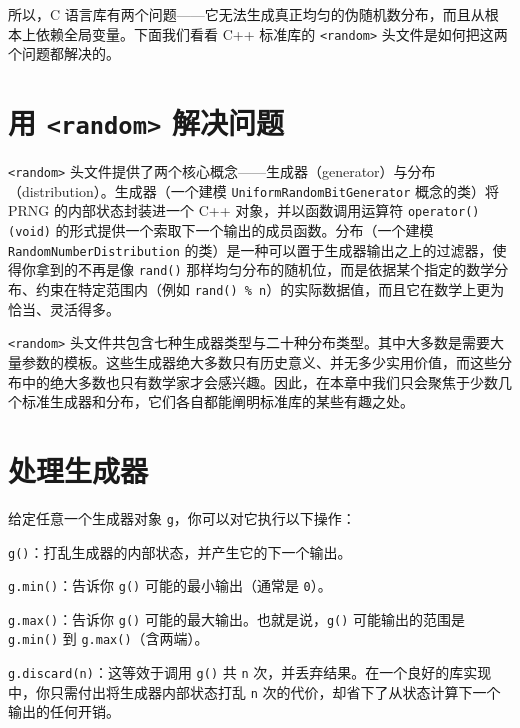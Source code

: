 所以，C 语言库有两个问题——它无法生成真正均匀的伪随机数分布，而且从根本上依赖全局变量。下面我们看看 C++ 标准库的 \texttt{<random>\allowbreak{}} 头文件是如何把这两个问题都解决的。

\section{用 \texttt{<random>\allowbreak{}} 解决问题}

\texttt{<random>\allowbreak{}} 头文件提供了两个核心概念——生成器（generator）与分布（distribution）。生成器（一个建模 \texttt{Uniform\allowbreak{}Random\allowbreak{}Bit\allowbreak{}Generator} 概念的类）将 PRNG 的内部状态封装进一个 C++ 对象，并以函数调用运算符 \texttt{operator(\allowbreak{})\allowbreak{}(\allowbreak{}void)\allowbreak{}} 的形式提供一个索取下一个输出的成员函数。分布（一个建模 \texttt{Random\allowbreak{}Number\allowbreak{}Distribution} 的类）是一种可以置于生成器输出之上的过滤器，使得你拿到的不再是像 \texttt{rand(\allowbreak{})\allowbreak{}} 那样均匀分布的随机位，而是依据某个指定的数学分布、约束在特定范围内（例如 \texttt{rand(\allowbreak{})\allowbreak{} \% n}）的实际数据值，而且它在数学上更为恰当、灵活得多。

\texttt{<random>\allowbreak{}} 头文件共包含七种生成器类型与二十种分布类型。其中大多数是需要大量参数的模板。这些生成器绝大多数只有历史意义、并无多少实用价值，而这些分布中的绝大多数也只有数学家才会感兴趣。因此，在本章中我们只会聚焦于少数几个标准生成器和分布，它们各自都能阐明标准库的某些有趣之处。

\section{处理生成器}

给定任意一个生成器对象 \texttt{g}，你可以对它执行以下操作：

\texttt{g(\allowbreak{})\allowbreak{}}：打乱生成器的内部状态，并产生它的下一个输出。

\texttt{g.\allowbreak{}min(\allowbreak{})\allowbreak{}}：告诉你 \texttt{g(\allowbreak{})\allowbreak{}} 可能的最小输出（通常是 \texttt{0}）。

\texttt{g.\allowbreak{}max(\allowbreak{})\allowbreak{}}：告诉你 \texttt{g(\allowbreak{})\allowbreak{}} 可能的最大输出。也就是说，\texttt{g(\allowbreak{})\allowbreak{}} 可能输出的范围是 \texttt{g.\allowbreak{}min(\allowbreak{})\allowbreak{}} 到 \texttt{g.\allowbreak{}max(\allowbreak{})\allowbreak{}}（含两端）。

\texttt{g.\allowbreak{}discard(\allowbreak{}n)\allowbreak{}}：这等效于调用 \texttt{g(\allowbreak{})\allowbreak{}} 共 \texttt{n} 次，并丢弃结果。在一个良好的库实现中，你只需付出将生成器内部状态打乱 \texttt{n} 次的代价，却省下了从状态计算下一个输出的任何开销。

